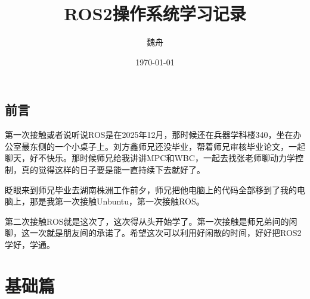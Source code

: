 \documentclass[12pt,a4paper]{ctexbook}
\title{ROS2操作系统学习记录}
\author{魏舟}
\date{\today}
\begin{document}
\frontmatter
\maketitle

\tableofcontents

\chapter*{前言}
第一次接触或者说听说ROS是在2025年12月，那时候还在兵器学科楼340，坐在办公室最东侧的一个小桌子上。刘方鑫师兄还没毕业，帮着师兄审核毕业论文，一起聊天，好不快乐。那时候师兄给我讲讲MPC和WBC，一起去找张老师聊动力学控制，真的觉得这样的日子要是能一直持续下去就好了。

眨眼来到师兄毕业去湖南株洲工作前夕，师兄把他电脑上的代码全部移到了我的电脑上，那是我第一次接触Unbuntu，第一次接触ROS。

第二次接触ROS就是这次了，这次得从头开始学了。第一次接触是师兄弟间的闲聊，这一次就是朋友间的承诺了。希望这次可以利用好闲散的时间，好好把ROS2学好，学通。

\mainmatter

\part{基础篇}




% 
\end{document}
